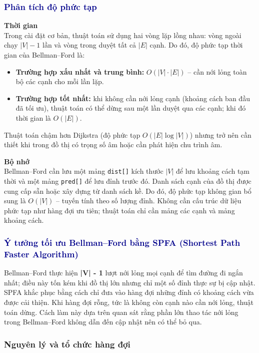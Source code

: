 \documentclass[14pt,a4paper]{report}
\begin{document}
\subsubsection{\textcolor{darkblue}{Phân tích độ phức tạp}}

\textbf{Thời gian}\\
Trong cài đặt cơ bản, thuật toán sử dụng hai vòng lặp lồng nhau: vòng ngoài chạy $|V|-1$ lần và vòng trong duyệt tất cả $|E|$ cạnh. Do đó, độ phức tạp thời gian của Bellman--Ford là:
\begin{itemize}
    \item \textbf{Trường hợp xấu nhất và trung bình:} $O(|V|\cdot|E|)$ -- cần nới lỏng toàn bộ các cạnh cho mỗi lần lặp.
    \item \textbf{Trường hợp tốt nhất:} khi không cần nới lỏng cạnh (khoảng cách ban đầu đã tối ưu), thuật toán có thể dừng sau một lần duyệt qua các cạnh; khi đó thời gian là $O(|E|)$.
\end{itemize}

Thuật toán chậm hơn Dijkstra (độ phức tạp $O(|E|\log|V|)$) nhưng trở nên cần thiết khi trong đồ thị có trọng số âm hoặc cần phát hiện chu trình âm.

\textbf{Bộ nhớ}\\
Bellman--Ford cần lưu một mảng \texttt{dist[]} kích thước $|V|$ để lưu khoảng cách tạm thời và một mảng \texttt{pred[]} để lưu đỉnh trước đó. Danh sách cạnh của đồ thị được cung cấp sẵn hoặc xây dựng từ danh sách kề. Do đó, độ phức tạp không gian bổ sung là $O(|V|)$ -- tuyến tính theo số lượng đỉnh. Không cần cấu trúc dữ liệu phức tạp như hàng đợi ưu tiên; thuật toán chỉ cần mảng các cạnh và mảng khoảng cách.

\subsubsection{\textcolor{darkblue}{Ý tưởng tối ưu Bellman--Ford bằng SPFA (Shortest Path Faster Algorithm)}}

Bellman--Ford thực hiện \textbf{ |V| - 1 } lượt nới lỏng mọi cạnh để tìm đường đi ngắn nhất; điều này tốn kém khi đồ thị lớn nhưng chỉ một số đỉnh thực sự bị cập nhật. SPFA khắc phục bằng cách chỉ đưa vào hàng đợi những đỉnh có khoảng cách vừa được cải thiện. Khi hàng đợi rỗng, tức là không còn cạnh nào cần nới lỏng, thuật toán dừng. Cách làm này dựa trên quan sát rằng phần lớn thao tác nới lỏng trong Bellman--Ford không dẫn đến cập nhật nên có thể bỏ qua.

\subsubsection{Nguyên lý và tổ chức hàng đợi}
\end{document}
